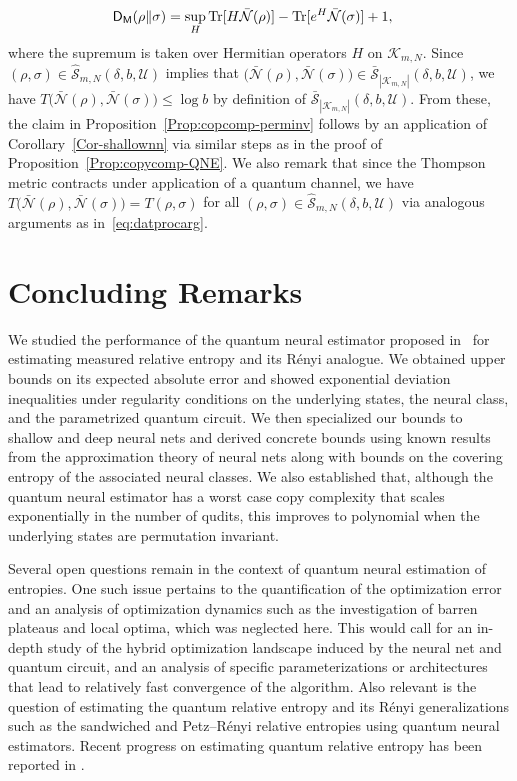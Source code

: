 \documentclass[a4paper,onecolumn,11pt,accepted=2026-05-12]{quantumarticle}
\newcommand{\sD}{\mathsf{D}}
\newcommand{\cK}{\mathcal{K}}
\newcommand{\cN}{\mathcal{N}}
\newcommand{\cS}{\mathcal{S}}
\newcommand{\cU}{\mathcal{U}}
\begin{document}
\begin{align}
\sD_{\mathsf{M}}(\rho\Vert\sigma)  &=\sup_{H}\operatorname{Tr}[H\bar{\cN}(\rho)
]-\operatorname{Tr}[e^H\bar{\cN}(\sigma)]+1, \notag 
\end{align}
where the supremum is taken over Hermitian operators  $H$ on $\cK_{m,N}$. Since  $(\rho,\sigma) \in \hat{\cS}_{m,N}(\delta, b,\cU)$ implies that $\big(\bar{\cN}(\rho),\bar{\cN}(\sigma)\big) \in \bar{\cS}_{|\cK_{m,N}|}(\delta, b,\cU)$, we have  $ T\big(\bar{\cN}(\rho),\bar{\cN}(\sigma)\big) \leq  \log b$ by definition of $\bar{\cS}_{|\cK_{m,N}|}(\delta, b,\cU)$. From these,  the claim in Proposition~\ref{Prop:copcomp-perminv} follows by an application of Corollary~\ref{Cor-shallownn} via similar steps as in the proof of Proposition~\ref{Prop:copycomp-QNE}. We also remark that since the Thompson metric contracts under application of a quantum channel, we have $T\big(\bar{\cN} (\rho),\bar{\cN} (\sigma)\big) =T(\rho,\sigma)$ for all   $(\rho,\sigma) \in \hat{\cS}_{m,N}(\delta, b,\cU)$ via analogous  arguments as in~\eqref{eq:datprocarg}.

\section{Concluding Remarks}

\label{Sec:concl-remarks}

We studied the performance of the quantum neural estimator proposed in~\cite{QNE-24} for estimating  measured relative entropy and its R\'{e}nyi analogue. We obtained upper bounds on its expected absolute error and showed exponential deviation inequalities under regularity conditions on the underlying states, the neural class, and the parametrized quantum circuit. We then specialized our bounds to  shallow and deep neural nets and derived concrete bounds using known results from the approximation theory of neural nets along with bounds on the covering entropy of the associated neural classes. We also established that, although the quantum neural estimator has a worst case copy complexity that scales exponentially in the number of qudits, this improves  to polynomial when the underlying states are permutation invariant. 


Several open questions remain in the context of quantum neural estimation of entropies. One such issue pertains to the quantification of the optimization error and an analysis of optimization dynamics such as the investigation of barren plateaus and local optima, which was neglected here. This would call for an in-depth study of the hybrid optimization landscape induced by the neural net and quantum circuit, and an  analysis of specific parameterizations or architectures that lead to relatively fast convergence of the algorithm. Also relevant is the question of estimating the quantum relative entropy and its R\'{e}nyi generalizations such as the sandwiched and Petz--R\'{e}nyi  relative entropies using quantum neural estimators. Recent progress on estimating quantum relative entropy has been reported in \cite{lu2025estimatingquantumrelativeentropies}.
\end{document}

